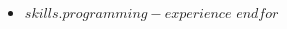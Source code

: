 \documentclass[letterpaper,11pt]{article}
\makeatletter
\newcommand{\ressubheading}[4]{\vspace{-7pt}
\begin{tabular*}{7in}{l@{\extracolsep{\fill}}r}
	\textbf{#1} & #2 \\
	\ifstrempty{#3}{
	}{
		\textit{#3} & #4 \\
	}
\end{tabular*}\vspace{-6pt}}
\makeatother
\begin{document}
\begin{multicols*}{4}
%
	\begin{itemize}
		$for(skills.programming-experience)$
			\item{$skills.programming-experience$}\vspace{-7pt}
		$endfor$
	\end{itemize}
%
\end{multicols*}
% 
\end{document}
